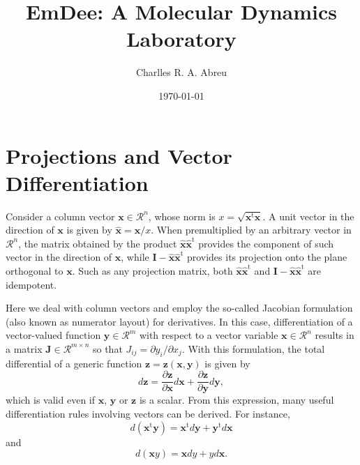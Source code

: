 \documentclass[11pt]{article}
\newcommand{\mt}[1]{\boldsymbol{\mathbf{#1}}}           %
\newcommand{\vt}[1]{\boldsymbol{\mathbf{#1}}}           %
\newcommand{\tr}[1]{#1^\text{t}}                        %
\newcommand{\diff}[2]{\frac{\partial #1}{\partial #2}}  %
\begin{document}
\title{EmDee: A Molecular Dynamics Laboratory}

\author{Charlles R. A. Abreu}

\date{\today}

\maketitle

\section{Projections and Vector Differentiation}

Consider a column vector $\vt x \in \mathcal{R}^n$, whose norm is $x = \sqrt{\tr{\vt x}{\vt x}}$. A unit vector in the direction of $\vt x$ is given by $\vt{\hat x} = {\vt x}/x$. When premultiplied by an arbitrary vector in $\mathcal{R}^n$, the matrix obtained by the product $\vt{\hat x}\tr{\vt{\hat x}}$ provides the component of such vector in the direction of $\vt x$, while $\mt I - \vt{\hat x}\tr{\vt{\hat x}}$ provides its projection onto the plane orthogonal to $\vt x$. Such as any projection matrix, both $\vt{\hat x}\tr{\vt{\hat x}}$ and $\mt I - \vt{\hat x}\tr{\vt{\hat x}}$ are idempotent.

Here we deal with column vectors and employ the so-called Jacobian formulation (also known as numerator layout) for derivatives. In this case, differentiation of a vector-valued function $\vt y \in \mathcal{R}^m$ with respect to a vector variable $\vt x \in \mathcal{R}^n$ results in a matrix $\mt J \in \mathcal{R}^{m \times n}$ so that $J_{ij} = \partial y_i / \partial x_j$. With this formulation, the total differential of a generic function $\vt z = {\vt z}(\vt x,\vt y)$ is given by 
\[
d{\vt z} = \diff{\vt z}{\vt x} d{\vt x} + \diff{\vt z}{\vt y} d{\vt y},
\]
which is valid even if $\vt x$, $\vt y$ or $\vt z$ is a scalar. From this expression, many useful differentiation rules involving vectors can be derived. For instance,
\begin{equation}
\label{eq:prod_rule_1}
d(\tr{\vt x}{\vt y}) = \tr{\vt x}d{\vt y} + \tr{\vt y}d{\vt x}
\end{equation}
and
\begin{equation}
\label{eq:prod_rule_2}
d({\vt x}y) = {\vt x}dy + y d{\vt x}.
\end{equation}
\end{document}
